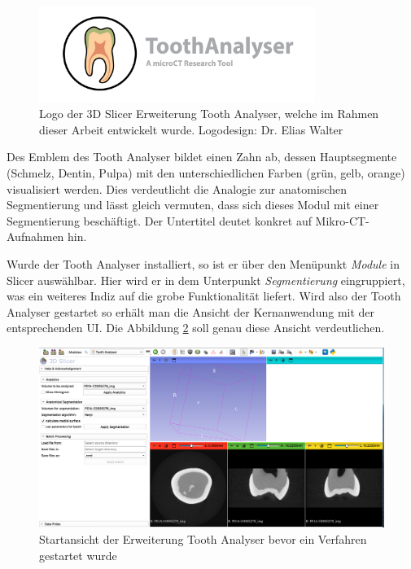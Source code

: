 \begin{figure}[h]
	\centering
	\includegraphics[width=0.8\textwidth]{img/SlicerToothAnalyser.png}
	\caption{Logo der 3D Slicer Erweiterung Tooth Analyser, welche im Rahmen dieser
	Arbeit entwickelt wurde. Logodesign: Dr. Elias Walter}
	\label{fig:logo_tooth_analyser}
\end{figure}

Des Emblem des Tooth Analyser bildet einen Zahn ab, dessen Hauptsegmente (Schmelz,
Dentin, Pulpa) mit den unterschiedlichen Farben (grün, gelb, orange)
visualisiert werden. Dies verdeutlicht die Analogie zur anatomischen Segmentierung
und lässt gleich vermuten, dass sich dieses Modul mit einer Segmentierung
beschäftigt. Der Untertitel deutet konkret auf Mikro-\ac{CT}-Aufnahmen hin.

Wurde der Tooth Analyser installiert, so ist er über den Menüpunkt \textit{Module}
in Slicer auswählbar. Hier wird er in dem Unterpunkt \textit{Segmentierung}
eingruppiert, was ein weiteres Indiz auf die grobe Funktionalität liefert. Wird
also der Tooth Analyser gestartet so erhält man die Ansicht der Kernanwendung
mit der entsprechenden \ac{UI}. Die Abbildung \ref{fig:tooth_analyser_start_up}
soll genau diese Ansicht verdeutlichen.

\begin{figure}[h]
	\centering
	\includegraphics[scale=0.2, width=\textwidth]{img/toothAnalyserStarUp.png}
	\caption{Startansicht der Erweiterung Tooth Analyser bevor ein Verfahren
	gestartet wurde}
	\label{fig:tooth_analyser_start_up}
\end{figure}

